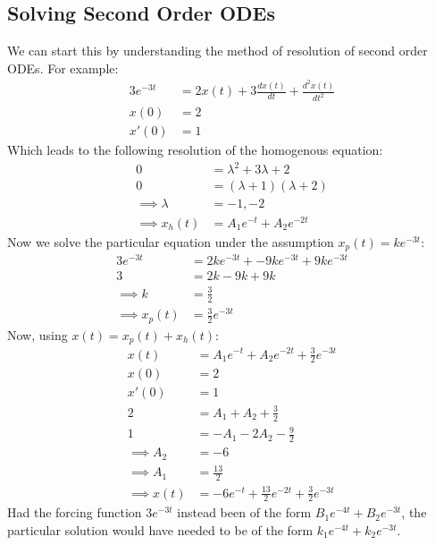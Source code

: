 \documentclass[nobib]{tufte-handout}
\begin{document}
\subsection{Solving Second Order ODEs}
We can start this by understanding the method of resolution of second order
ODEs. For example:
\begin{align*}
    3e^{-3t} & = 2x(t)+3\frac{dx(t)}{dt}+\frac{d^2x(t)}{dt^2} \\
    x(0)     & = 2                                            \\
    x'(0)    & = 1
\end{align*}
Which leads to the following resolution of the homogenous equation:
\begin{align*}
    0                & = \lambda^2+3\lambda+2   \\
    0                & = (\lambda+1)(\lambda+2) \\
    \implies \lambda & = -1, -2                 \\
    \implies x_h(t)  & = A_1e^{-t}+A_2e^{-2t}
\end{align*}
Now we solve the particular equation under the assumption $x_p(t)=ke^{-3t}$:
\begin{align*}
    3e^{-3t}        & = 2ke^{-3t}+-9ke^{-3t}+9ke^{-3t} \\
    3               & = 2k-9k+9k                       \\
    \implies k      & = \frac{3}{2}                    \\
    \implies x_p(t) & = \frac{3}{2}e^{-3t}
\end{align*}
Now, using $x(t)=x_p(t)+x_h(t)$:
\begin{align*}
    x(t)          & = A_1e^{-t}+A_2e^{-2t} + \frac{3}{2}e^{-3t}       \\
    x(0)          & = 2                                               \\
    x'(0)         & = 1                                               \\
    2             & = A_1+A_2+\frac{3}{2}                             \\
    1             & = -A_1-2A_2-\frac{9}{2}                           \\
    \implies A_2  & = -6                                              \\
    \implies A_1  & = \frac{13}{2}                                    \\
    \implies x(t) & = -6e^{-t}+\frac{13}{2}e^{-2t}+\frac{3}{2}e^{-3t}
\end{align*}
Had the forcing function $3e^{-3t}$ instead been of the form $B_1e^{-4t}+B_2e^{-3t}$, the particular solution would have needed to be of the form $k_1e^{-4t}+k_2e^{-3t}$.
\end{document}
